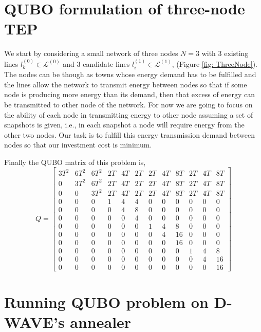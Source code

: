\section{QUBO formulation of three-node TEP}
We start by considering a small network of three nodes $N=3$ with 3 existing lines $l_{k}^{(0)}\in \mathcal{L}^{(0)}$ and 3 candidate lines $l_{i}^{(1)}\in \mathcal{L}^{(1)}$, (Figure \ref{fig: ThreeNode}). The nodes can be though as towns whose energy demand has to be fulfilled and the lines allow the network to transmit energy between nodes so that if some node is producing more energy than its demand, then that excess of energy can be transmitted to other node of the network. For now we are going to focus on the ability of each node in transmitting energy to other node assuming a set of snapshots is given, i.e., in each snapshot a node will require energy from the other two nodes. Our task is to fulfill this energy transmission demand between nodes so that our investment cost is minimum.

Finally the QUBO matrix of this problem is,
\begin{equation}
Q =
        \begin{bmatrix}
           3T^{2} & 6T^{2} & 6T^{2} & 2T & 4T & 2T & 2T & 4T & 8T &2T & 4T & 8T  \\
           0 &3T^{2}& 6T^{2} & 2T & 4T & 2T & 2T & 4T & 8T &2T & 4T & 8T \\
           0 & 0 & 3T^{2} &2T & 4T & 2T & 2T & 4T & 8T &2T & 4T & 8T \\
           0 & 0 & 0 & 1 & 4 & 4 & 0 & 0 & 0 & 0 & 0 & 0\\
           0 & 0 & 0 & 0 & 4 & 8 & 0 & 0 & 0 & 0 & 0 & 0\\
           0 & 0 & 0 & 0 & 0 & 4 & 0 & 0 & 0 & 0 & 0 & 0\\
           0 & 0 & 0 & 0 & 0 & 0 & 1 & 4 & 8 & 0 & 0 & 0\\
           0 & 0 & 0 & 0 & 0 & 0 & 0 & 4 & 16& 0 & 0 & 0\\
           0 & 0 & 0 & 0 & 0 & 0 & 0 & 0 & 16& 0 & 0 & 0\\
           0 & 0 & 0 & 0 & 0 & 0 & 0 & 0 & 0 & 1 & 4 & 8 \\
           0 & 0 & 0 & 0 & 0 & 0 & 0 & 0 & 0 & 0 & 4 & 16\\
           0 & 0 & 0 & 0 & 0 & 0 & 0 & 0 & 0 & 0 & 0 & 16
         \end{bmatrix}
\end{equation}
\section{Running QUBO problem on D-WAVE's annealer}
